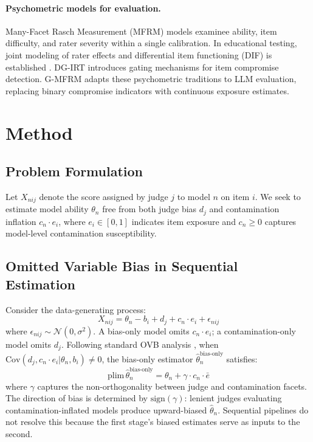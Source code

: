 \documentclass[11pt]{article}
\begin{document}
\paragraph{Psychometric models for evaluation.}
Many-Facet Rasch Measurement (MFRM) \cite{linacre1989many,eckes2011introduction,engelhard2013invariant} models examinee ability, item difficulty, and rater severity within a single calibration.
In educational testing, joint modeling of rater effects and differential item functioning (DIF) is established \cite{wind2018exploring,patz2002testlet,fox2001bayesian}.
DG-IRT \cite{shu2013item} introduces gating mechanisms for item compromise detection.
G-MFRM adapts these psychometric traditions to LLM evaluation, replacing binary compromise indicators with continuous exposure estimates.

\section{Method}

\subsection{Problem Formulation}

Let $X_{nij}$ denote the score assigned by judge $j$ to model $n$ on item $i$.
We seek to estimate model ability $\theta_n$ free from both judge bias $d_j$ and contamination inflation $c_n \cdot e_i$, where $e_i \in [0,1]$ indicates item exposure and $c_n \geq 0$ captures model-level contamination susceptibility.

\subsection{Omitted Variable Bias in Sequential Estimation}
\label{sec:ovb}

Consider the data-generating process:
\begin{equation}
X_{nij} = \theta_n - b_i + d_j + c_n \cdot e_i + \epsilon_{nij}
\end{equation}
where $\epsilon_{nij} \sim \mathcal{N}(0, \sigma^2)$.
A bias-only model omits $c_n \cdot e_i$; a contamination-only model omits $d_j$.
Following standard OVB analysis \cite{angrist2009mostly}, when $\text{Cov}(d_j, c_n \cdot e_i | \theta_n, b_i) \neq 0$, the bias-only estimator $\hat{\theta}_n^{\text{bias-only}}$ satisfies:
\begin{equation}
\text{plim}\,\hat{\theta}_n^{\text{bias-only}} = \theta_n + \gamma \cdot c_n \cdot \bar{e}
\end{equation}
where $\gamma$ captures the non-orthogonality between judge and contamination facets.
The direction of bias is determined by $\text{sign}(\gamma)$: lenient judges evaluating contamination-inflated models produce upward-biased $\hat{\theta}_n$.
Sequential pipelines do not resolve this because the first stage's biased estimates serve as inputs to the second.
\end{document}
